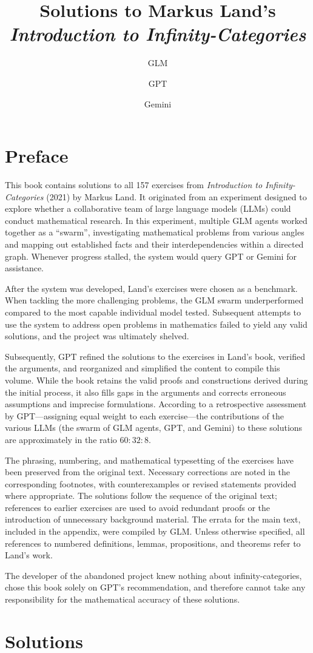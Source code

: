 \documentclass[11pt,a4paper,oneside]{book}
\title{Solutions to Markus Land's\\\emph{Introduction to Infinity-Categories}}
\author{GLM \and GPT \and Gemini}
\date{}
\begin{document}
\frontmatter
\maketitle
\tableofcontents

\chapter*{Preface}

This book contains solutions to all 157 exercises from \emph{Introduction to Infinity-Categories} (2021) by Markus Land.
It originated from an experiment designed to explore whether a collaborative team of large language models (LLMs) could
conduct mathematical research. In this experiment, multiple GLM agents worked together as a ``swarm'', investigating
mathematical problems from various angles and mapping out established facts and their interdependencies within a directed
graph. Whenever progress stalled, the system would query GPT or Gemini for assistance.

After the system was developed, Land's exercises were chosen as a benchmark. When tackling the
more challenging problems, the GLM swarm underperformed compared to the most capable
individual model tested. Subsequent attempts to use the system to address open problems in mathematics failed to yield
any valid solutions, and the project was ultimately shelved.

Subsequently, GPT refined the solutions to the exercises in Land’s book, verified the arguments, and reorganized and
simplified the content to compile this volume. While the book retains the valid proofs and constructions derived during
the initial process, it also fills gaps in the arguments and corrects erroneous assumptions and imprecise formulations. According to a
retrospective assessment by GPT—assigning equal weight to each exercise—the contributions of the various LLMs
(the swarm of GLM agents, GPT, and Gemini) to these solutions are approximately in the ratio $60:32:8$.

The phrasing, numbering, and mathematical typesetting of the exercises have been preserved from the original text.
Necessary corrections are noted in the corresponding footnotes, with counterexamples or revised statements provided
where appropriate. The solutions follow the sequence of the original text; references to earlier exercises are used
to avoid redundant proofs or the introduction of unnecessary background material. The errata for the main text,
included in the appendix, were compiled by GLM. Unless otherwise specified, all references to numbered definitions,
lemmas, propositions, and theorems refer to Land’s work.

The developer of the abandoned project knew nothing about infinity-categories, chose this book solely on GPT's
recommendation, and therefore cannot take any responsibility for the mathematical accuracy of these solutions.

\mainmatter

\chapter{Solutions}


\appendix

\end{document}
